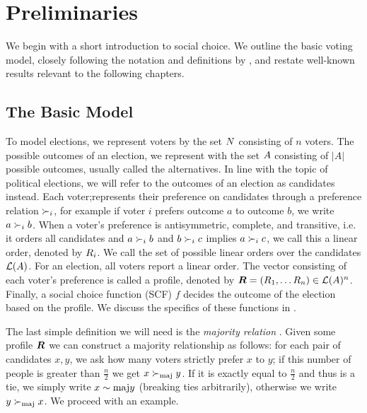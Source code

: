 \chapter{Preliminaries}
\label{chap: preliminaries}

We begin with a short introduction to social choice. We outline the basic
voting model, closely following the notation and definitions by
\citet{brandtHandbookComputationalSocial2016}, and restate well-known results
relevant to the following chapters.

\section{The Basic Model}

To model elections, we represent voters by the set $N$ consisting of $n$
voters. The possible outcomes of an election, we represent with the set
$A$ consisting of $|A|$ possible outcomes, usually called the alternatives. In line with the topic of political elections, we will
refer to the outcomes of an election as candidates instead. Each voter;represents
their preference on candidates through a preference relation $\succ_i$, for
example if voter $i$ prefers outcome $a$ to outcome $b$, we write $a \succ_{i} b$.
When a voter's preference is antisymmetric, complete, and transitive, i.e. it orders
all candidates and $a \succ_i b$ and $b \succ_i c$ implies $a \succ_i c$, we
call this a linear order, denoted by $R_i$. We call the set of possible linear orders over the
candidates $\mathcal{L}(A)$.  For an election, all voters report a
linear order. The vector consisting of each voter's preference is called a
profile, denoted by $\boldsymbol{R} = (R_1, \dots R_{n}) \in \mathcal{L}(A)^{n}$. Finally, a social choice function (SCF)
$f$ decides the outcome of the election based on the profile. We discuss the
specifics of these functions in .

The last simple definition we will need is the \emph{majority relation}
\cite{alma990028050780205131}. Given some profile $\boldsymbol{R}$ we can
construct a majority relationship as follows: for each pair of candidates
$x,y$, we ask how many voters strictly prefer $x$ to $y$; if this number of people is
greater than $\frac{n}{2}$ we get $x  \succ_{\textnormal{maj}} y$. If it is exactly equal to
$\frac{n}{2}$ and thus is a tie, we simply write $x \sim{\textnormal{maj}} y$ (breaking ties arbitrarily), otherwise we write $y \succ_{\textnormal{maj}} x$. We proceed with an
example.

